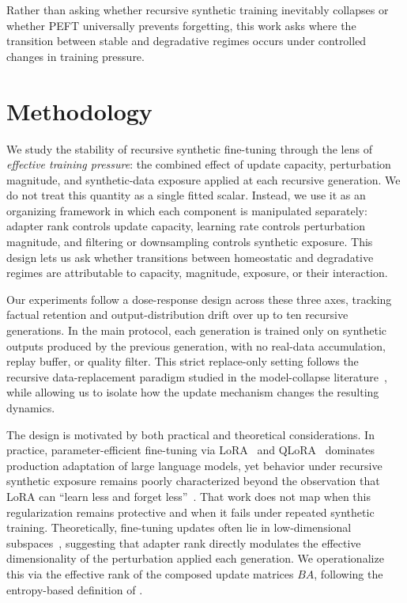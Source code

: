\documentclass[a4paper,fleqn]{cas-dc}
\begin{document}
Rather than asking whether recursive synthetic training inevitably collapses or
whether PEFT universally prevents forgetting, this work asks where the
transition between stable and degradative regimes occurs under controlled
changes in training pressure.

\section{Methodology}\label{sec:methodology}

We study the stability of recursive synthetic fine-tuning through the lens of
\textit{effective training pressure}: the combined effect of update capacity,
perturbation magnitude, and synthetic-data exposure applied at each recursive
generation. We do not treat this quantity as a single fitted scalar. Instead, we
use it as an organizing framework in which each component is manipulated
separately: adapter rank controls update capacity, learning rate controls
perturbation magnitude, and filtering or downsampling controls synthetic
exposure. This design lets us ask whether transitions between homeostatic and
degradative regimes are attributable to capacity, magnitude, exposure, or their
interaction.

Our experiments follow a dose-response design across these three axes, tracking
factual retention and output-distribution drift over up to ten recursive
generations. In the main protocol, each generation is trained only on synthetic
outputs produced by the previous generation, with no real-data accumulation,
replay buffer, or quality filter. This strict replace-only setting follows the
recursive data-replacement paradigm studied in the model-collapse
literature~\citep{shumailov2024,dohmatob2025,gerstgrasser2024}, while allowing
us to isolate how the update mechanism changes the resulting dynamics.

The design is motivated by both practical and theoretical considerations. In
practice, parameter-efficient fine-tuning via LoRA~\citep{hu2022} and
QLoRA~\citep{dettmers2023} dominates production adaptation of large language
models, yet behavior under recursive synthetic exposure remains poorly
characterized beyond the observation that LoRA can ``learn less and forget
less''~\citep{biderman2024}. That work does not map when this regularization
remains protective and when it fails under repeated synthetic training.
Theoretically, fine-tuning updates often lie in low-dimensional
subspaces~\citep{aghajanyan2021}, suggesting that adapter rank directly
modulates the effective dimensionality of the perturbation applied each
generation. We operationalize this via the effective rank of the composed update
matrices $BA$, following the entropy-based definition of
\citet{roy2007}.
\end{document}
